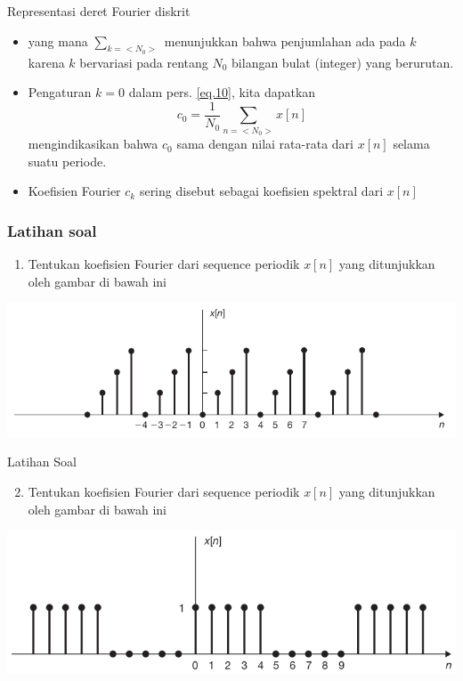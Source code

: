 \documentclass[pdflatex,compress,mathserif]{beamer}
\begin{document}
\begin{frame}{Representasi deret Fourier diskrit}
	\begin{itemize}
		\item[] yang mana $ \sum_{k = <N_0>} $ menunjukkan bahwa penjumlahan ada pada $ k $ karena $ k $ bervariasi pada rentang $ N_0 $ bilangan bulat (integer) yang berurutan.
		\item Pengaturan $ k = 0 $ dalam pers. \ref{eq.10}, kita dapatkan
		\begin{equation}\label{eq.11}
			c_0 = \frac{1}{N_0} \sum_{n = <N_0>} x[n]
		\end{equation}
		mengindikasikan bahwa $ c_0 $ sama dengan nilai rata-rata dari $ x[n] $ selama suatu periode.
		\item Koefisien Fourier $ c_k $ sering disebut sebagai koefisien spektral dari $ x[n] $
	\end{itemize}
\end{frame}

\begin{frame}
	\frametitle{Latihan soal}
	\begin{enumerate}
		\item Tentukan koefisien Fourier dari sequence periodik $ x[n] $ yang ditunjukkan oleh gambar di bawah ini
	\end{enumerate}
	\begin{center}
		\includegraphics[width=\linewidth]{img/img01}
	\end{center}
\end{frame}

\begin{frame}{Latihan Soal}
	\begin{enumerate}
		\setcounter{enumi}{1}
		\item Tentukan koefisien Fourier dari sequence periodik $ x[n] $ yang ditunjukkan oleh gambar di bawah ini
	\end{enumerate}
	\begin{center}
		\includegraphics[width=\linewidth]{img/img02}
	\end{center}
\end{frame}
\end{document}
